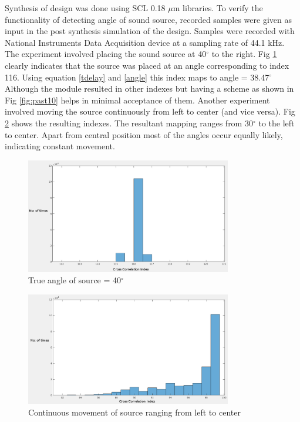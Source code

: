 \documentclass[conference]{IEEEtran}
\begin{document}
Synthesis of design was done using SCL 0.18 $\mu$m libraries. To verify the functionality of detecting angle of sound source, recorded samples were given as input in the post synthesis simulation of the design. Samples were recorded with National Instruments Data Acquisition device at a sampling rate of 44.1 kHz. The experiment involved placing the sound source at 40$^\circ$ to the right. Fig \ref{fig:right} clearly indicates that the source was placed at an angle corresponding to index 116. Using equation \ref{tdelay} and \ref{angle} this index maps to angle = 38.47$^\circ$ Although the module resulted in other indexes but having a scheme as shown in Fig \ref{fig:past10} helps in minimal acceptance of them. Another experiment involved moving the source continuously from left to center (and vice versa). Fig \ref{fig:left} shows the resulting indexes. The resultant mapping ranges from 30$^\circ$ to the left to center. Apart from central position most of the angles occur equally likely, indicating constant movement. 

\begin{figure}
    \centering
    \includegraphics[width = 9cm]{right.png}
    \caption{True angle of source = 40$^\circ$}
    \label{fig:right}
\end{figure}

\begin{figure}
    \centering
    \includegraphics[width = 9cm]{left.png}
    \caption{Continuous movement of source ranging from left to center}
    \label{fig:left}
\end{figure}
\end{document}
